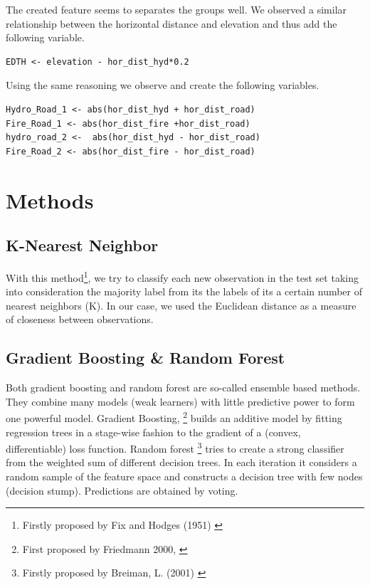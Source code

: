 \documentclass[paper=a4, fontsize=11pt]{scrartcl}
\numberwithin{equation}{section}
\numberwithin{figure}{section}
\numberwithin{table}{section}
\begin{document}
The created feature seems to separates the groups well. We observed a similar relationship between the horizontal distance and elevation and thus add the following variable.\\

\begin{lstlisting}
EDTH <- elevation - hor_dist_hyd*0.2
\end{lstlisting}

Using the same reasoning we observe and create the following variables.
\begin{lstlisting}
Hydro_Road_1 <- abs(hor_dist_hyd + hor_dist_road)
Fire_Road_1 <- abs(hor_dist_fire +hor_dist_road)
hydro_road_2 <-  abs(hor_dist_hyd - hor_dist_road)
Fire_Road_2 <- abs(hor_dist_fire - hor_dist_road)
\end{lstlisting}



\section{Methods}

\subsection{K-Nearest Neighbor}
With this method\footnote{Firstly proposed by Fix and Hodges (1951) \cite{knn}}, we try to classify each new observation in the test set taking into consideration the majority label from its the labels of its a certain number of nearest neighbors (K). In our case, we used the Euclidean distance as a measure of closeness between observations.

\subsection{Gradient Boosting  \& Random Forest}
Both gradient boosting and random forest are so-called ensemble based methods. They combine many models (weak learners) with little predictive power to form one powerful model. 
Gradient Boosting,  \footnote{First proposed by Friedmann 2000, \cite{Friedman00greedyfunction}} builds an additive model by fitting regression trees in a stage-wise fashion to the gradient of a (convex, differentiable) loss function.
Random forest \footnote{Firstly proposed by Breiman, L. (2001) \cite{random} } tries to create a strong classifier from the weighted sum of different decision trees. In each iteration it considers a random sample of the feature space and constructs a  decision tree with few nodes (decision stump). Predictions are obtained by voting. 
\end{document}
